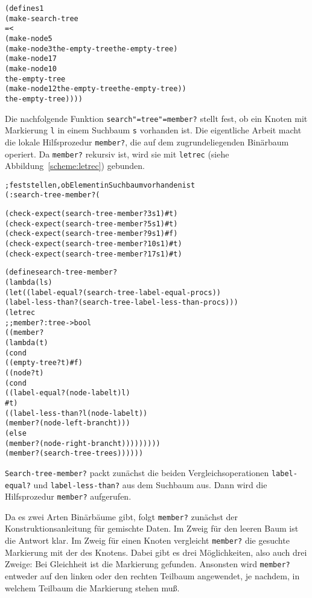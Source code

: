 \begin{alltt}
(define s1
  (make-search-tree
   = <
   (make-node 5
              (make-node 3 the-empty-tree the-empty-tree)
              (make-node 17
                         (make-node 10 
                                    the-empty-tree 
                                    (make-node 12 the-empty-tree the-empty-tree))
                         the-empty-tree))))
\end{alltt}
%
Die nachfolgende Funktion \texttt{search"=tree"=member?} 
stellt fest, ob ein Knoten mit Markierung \texttt{l} in einem
Suchbaum \texttt{s} vorhanden ist. Die eigentliche Arbeit
macht die lokale Hilfsprozedur \texttt{member?},
die auf dem zugrundeliegenden Binärbaum operiert.  Da \texttt{member?} rekursiv
ist, wird sie mit \texttt{letrec} (siehe
Abbildung~\ref{scheme:letrec}) gebunden.
%
\begin{alltt}
; feststellen, ob Element in Suchbaum vorhanden ist
(: search-tree-member? (%a (search-tree-of %a) -> boolean))

(check-expect (search-tree-member? 3 s1) #t)
(check-expect (search-tree-member? 5 s1) #t)
(check-expect (search-tree-member? 9 s1) #f)
(check-expect (search-tree-member? 10 s1) #t)
(check-expect (search-tree-member? 17 s1) #t)

(define search-tree-member?
  (lambda (l s)
    (let ((label-equal? (search-tree-label-equal-proc s))
          (label-less-than? (search-tree-label-less-than-proc s)))
      (letrec
          ;; member? : tree -> bool
          ((member?
            (lambda (t)
              (cond
               ((empty-tree? t) #f)
               ((node? t)
                (cond                 
                  ((label-equal? (node-label t) l)
                   #t)
                  ((label-less-than? l (node-label t))
                   (member? (node-left-branch t)))
                  (else
                   (member? (node-right-branch t)))))))))
        (member? (search-tree-tree s))))))
\end{alltt}
%
\texttt{Search-tree-member?} packt zunächst die beiden
Vergleichsoperationen \texttt{label-equal?} und
\texttt{label-less-than?} aus dem Suchbaum aus.
Dann wird die Hilfsprozedur \texttt{member?} aufgerufen.

Da es zwei Arten Binärbäume gibt, folgt 
\texttt{member?} zunächst der Konstruktionsanleitung für
gemischte Daten.  Im Zweig für den leeren Baum ist die Antwort
klar.  Im Zweig für einen Knoten vergleicht \texttt{member?} die
gesuchte Markierung mit der des Knotens.  Dabei gibt es drei
Möglichkeiten, also auch drei Zweige: Bei Gleichheit ist die Markierung
gefunden.  Ansonsten wird \texttt{member?} entweder auf den linken
oder den rechten Teilbaum angewendet, je nachdem, in welchem Teilbaum
die Markierung stehen muß.

